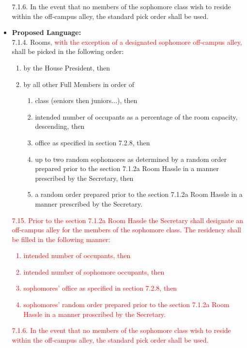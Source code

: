 \documentclass[10pt]{article} %
\begin{document}
\begin{itemize}
	7.1.6. In the event that no members of the sophomore class wish to reside within the off-campus alley, the standard pick order shall be used.
	
	\item \textbf{Proposed Language:} \\
	7.1.4. Rooms\textcolor{red}{, with the exception of a designated sophomore off-campus alley,} shall be picked in the following order: 
	\begin{enumerate}[label=(\alph*)]
		\item by the House President, then 
		\item by all other Full Members in order of 
		\begin{enumerate}[label=(\roman*)]
			\item class (seniors then juniors...), then 
			\item intended number of occupants as a percentage of the room capacity, descending, then 
			\item office as specified in section 7.2.8, then 
			\item up to two random sophomores as determined by a random order prepared prior to the section 7.1.2a Room Hassle in a manner prescribed by the Secretary, then 
			\item a random order prepared prior to the section 7.1.2a Room Hassle in a manner prescribed by the Secretary.
		\end{enumerate}
	\end{enumerate}
	\textcolor{red}{
		7.15. Prior to the section 7.1.2a Room Hassle the Secretary shall designate an off-campus alley for the members of the sophomore class. The residency shall be filled in the following manner: 
		\begin{enumerate}[label=(\alph*)]
			\item intended number of occupants, then 
			\item intended number of sophomore occupants, then 
			\item sophomores' office as specified in section 7.2.8, then 
			\item sophomores' random order prepared prior to the section 7.1.2a Room Hassle in a manner proscribed by the Secretary. 
		\end{enumerate}
	}
	\textcolor{red}{
		7.1.6. In the event that no members of the sophomore class wish to reside within the off-campus alley, the standard pick order shall be used.
	}
\end{itemize}
\end{document}
